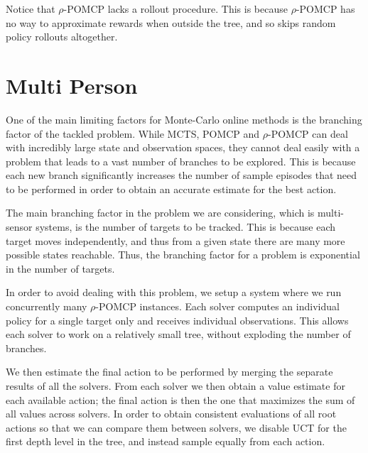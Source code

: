 Notice that $\rho$-POMCP lacks a rollout procedure. This is because $\rho$-POMCP has no way to
approximate rewards when outside the tree, and so skips random policy rollouts altogether.

\section{Multi Person}

One of the main limiting factors for Monte-Carlo online methods is the branching factor of the
tackled problem. While MCTS, POMCP and $\rho$-POMCP can deal with incredibly large state and
observation spaces, they cannot deal easily with a problem that leads to a vast number of branches
to be explored. This is because each new branch significantly increases the number of sample
episodes that need to be performed in order to obtain an accurate estimate for the best action.

The main branching factor in the problem we are considering, which is multi-sensor systems, is the
number of targets to be tracked. This is because each target moves independently, and thus from a
given state there are many more possible states reachable. Thus, the branching factor for a problem
is exponential in the number of targets.

In order to avoid dealing with this problem, we setup a system where we run concurrently many
$\rho$-POMCP instances. Each solver computes an individual policy for a single target only and
receives individual observations. This allows each solver to work on a relatively small tree,
without exploding the number of branches.

We then estimate the final action to be performed by merging the separate results of all the
solvers.  From each solver we then obtain a value estimate for each available action; the final
action is then the one that maximizes the sum of all values across solvers. In order to obtain
consistent evaluations of all root actions so that we can compare them between solvers, we disable
UCT for the first depth level in the tree, and instead sample equally from each action.
